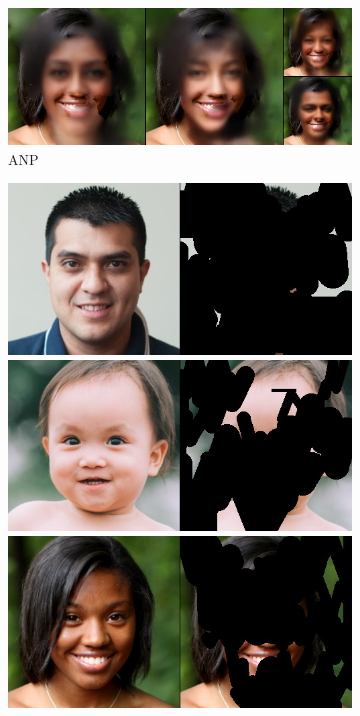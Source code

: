 \begin{figure}[t]
\begin{subfigure}[t]{0.25\textwidth}
      \includegraphics[height=\ffhqimgheight]{figs/cigcvae/image-samples/ffhq256/freeform_anp_32_samples.jpg}
      \caption{ANP}
    \end{subfigure}
    \begin{subfigure}[t]{0.22\textwidth}
      \centering
      \includegraphics[height=\ffhqimgheight]{figs/cigcvae/image-samples/ffhq256/freeform_aipo_0_gt_masked.jpg}
      \includegraphics[height=\ffhqimgheight]{figs/cigcvae/image-samples/ffhq256/freeform_aipo_13_gt_masked.jpg}
      \includegraphics[height=\ffhqimgheight]{figs/cigcvae/image-samples/ffhq256/freeform_aipo_32_gt_masked.jpg}

\end{subfigure}
\end{figure}
